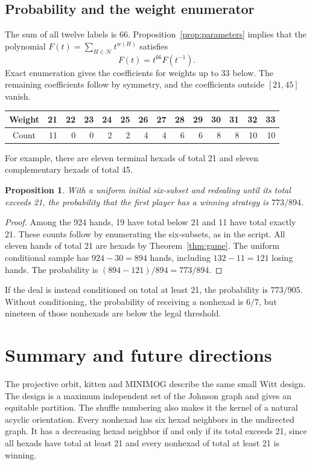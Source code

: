 \documentclass[12pt,letterpaper]{article}
\newtheorem{proposition}[theorem]{Proposition}
\theoremstyle{definition}\newtheorem{example}[theorem]{Example}
\numberwithin{equation}{section}
\begin{document}
\subsection{Probability and the weight enumerator}
The sum of all twelve labels is 66. Proposition~\ref{prop:parameters} implies that the polynomial $F(t)=\sum_{H\in\mathcal H}t^{w(H)}$ satisfies
\begin{equation}\label{eq:reciprocity}
F(t)=t^{66}F(t^{-1}).
\end{equation}
Exact enumeration gives the coefficients for weights up to 33 below. The remaining coefficients follow by symmetry, and the coefficients outside $[21,45]$ vanish.

\begin{center}\small
\begin{tabular}{c|rrrrrrrrrrrrr}
Weight&21&22&23&24&25&26&27&28&29&30&31&32&33\\\hline
Count&11&0&0&2&2&4&4&6&6&8&8&10&10
\end{tabular}
\end{center}

For example, there are eleven terminal hexads of total 21 and eleven complementary hexads of total 45.

\begin{proposition}\label{prop:probability}
With a uniform initial six-subset and redealing until its total exceeds 21, the probability that the first player has a winning strategy is $773/894$.
\end{proposition}

\begin{proof}
Among the 924 hands, 19 have total below 21 and 11 have total exactly 21. These counts follow by enumerating the six-subsets, as in the script. All eleven hands of total 21 are hexads by Theorem~\ref{thm:game}. The uniform conditional sample has $924-30=894$ hands, including $132-11=121$ losing hands. The probability is $(894-121)/894=773/894$.
\end{proof}

If the deal is instead conditioned on total at least 21, the probability is $773/905$. Without conditioning, the probability of receiving a nonhexad is $6/7$, but nineteen of those nonhexads are below the legal threshold.

\section{Summary and future directions}
The projective orbit, kitten and MINIMOG describe the same small Witt design. The design is a maximum independent set of the Johnson graph and gives an equitable partition. The shuffle numbering also makes it the kernel of a natural acyclic orientation. Every nonhexad has six hexad neighbors in the undirected graph. It has a decreasing hexad neighbor if and only if its total exceeds 21, since all hexads have total at least 21 and every nonhexad of total at least 21 is winning.
\end{document}
